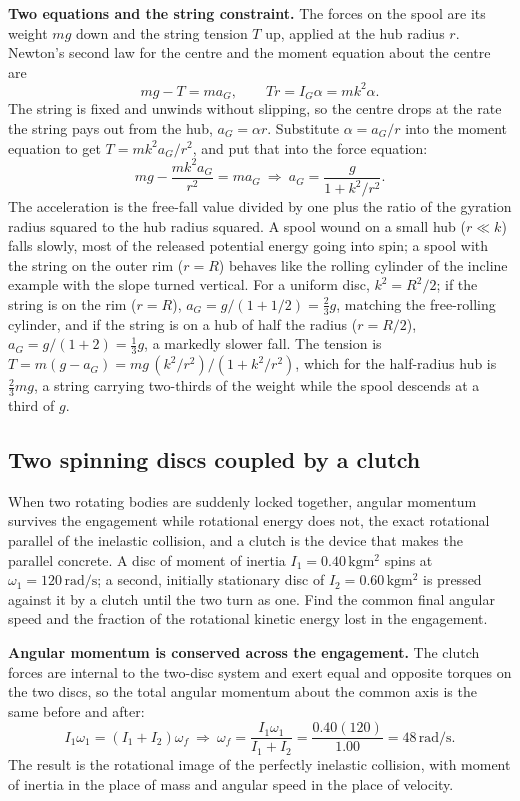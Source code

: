 \textbf{Two equations and the string constraint.} The forces on the
spool are its weight $mg$ down and the string tension $T$ up, applied at
the hub radius $r$. Newton's second law for the centre and the moment
equation about the centre are
\[
mg-T=ma_{G}, \qquad Tr=I_{G}\alpha=mk^{2}\alpha.
\]
The string is fixed and unwinds without slipping, so the centre drops at
the rate the string pays out from the hub, $a_{G}=\alpha r$. Substitute
$\alpha=a_{G}/r$ into the moment equation to get $T=mk^{2}a_{G}/r^{2}$,
and put that into the force equation:
\[
mg-\frac{mk^{2}a_{G}}{r^{2}}=ma_{G}
\ \Rightarrow\
a_{G}=\frac{g}{1+k^{2}/r^{2}}.
\]
The acceleration is the free-fall value divided by one plus the ratio of
the gyration radius squared to the hub radius squared. A spool wound on a
small hub ($r\ll k$) falls slowly, most of the released potential energy
going into spin; a spool with the string on the outer rim ($r=R$)
behaves like the rolling cylinder of the incline example with the slope
turned vertical. For a uniform disc, $k^{2}=R^{2}/2$; if the string is
on the rim ($r=R$), $a_{G}=g/(1+1/2)=\tfrac{2}{3}g$, matching the
free-rolling cylinder, and if the string is on a hub of half the radius
($r=R/2$), $a_{G}=g/(1+2)=\tfrac{1}{3}g$, a markedly slower fall. The
tension is $T=m(g-a_{G})=mg\,(k^{2}/r^{2})/(1+k^{2}/r^{2})$, which for
the half-radius hub is $\tfrac{2}{3}mg$, a string carrying two-thirds of
the weight while the spool descends at a third of $g$.

\subsection{Two spinning discs coupled by a clutch}

When two rotating bodies are suddenly locked together, angular momentum
survives the engagement while rotational energy does not, the exact
rotational parallel of the inelastic collision, and a clutch is the
device that makes the parallel concrete. A disc of moment of inertia
$I_{1}=0.40\,\si{\kilogram\meter\squared}$ spins at $\omega_{1}=120\,\si{
\radian\per\second}$; a second, initially stationary disc of
$I_{2}=0.60\,\si{\kilogram\meter\squared}$ is pressed against it by a
clutch until the two turn as one. Find the common final angular speed
and the fraction of the rotational kinetic energy lost in the
engagement.

\textbf{Angular momentum is conserved across the engagement.} The clutch
forces are internal to the two-disc system and exert equal and opposite
torques on the two discs, so the total angular momentum about the common
axis is the same before and after:
\[
I_{1}\omega_{1}=(I_{1}+I_{2})\omega_{f}
\ \Rightarrow\
\omega_{f}=\frac{I_{1}\omega_{1}}{I_{1}+I_{2}}=\frac{0.40(120)}{1.00}=
48\,\si{\radian\per\second}.
\]
The result is the rotational image of the perfectly inelastic collision,
with moment of inertia in the place of mass and angular speed in the
place of velocity.


